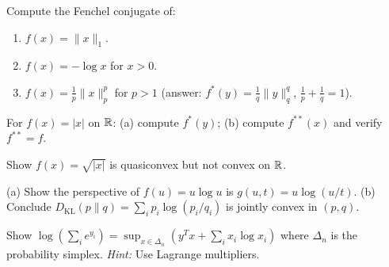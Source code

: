 \documentclass[11pt,a4paper]{article}
\begin{document}
\begin{exercise}
\label{exer:conjugates}
Compute the Fenchel conjugate of:
\begin{enumerate}[label=(\alph*)]
  \item $f(x) = \|x\|_1$.
  \item $f(x) = -\log x$ for $x > 0$.
  \item $f(x) = \frac{1}{p}\|x\|_p^p$ for $p > 1$
        (answer: $f^*(y) = \frac{1}{q}\|y\|_q^q$, $\frac{1}{p}+\frac{1}{q}=1$).
\end{enumerate}
\end{exercise}

\begin{exercise}
\label{exer:biconjugate}
For $f(x) = |x|$ on $\mathbb{R}$: (a) compute $f^*(y)$; (b) compute $f^{**}(x)$ and
verify $f^{**} = f$.
\end{exercise}

\begin{exercise}
\label{exer:quasiconvex}
Show $f(x) = \sqrt{|x|}$ is quasiconvex but not convex on $\mathbb{R}$.
\end{exercise}

\begin{exercise}
\label{exer:perspective-kl}
(a) Show the perspective of $f(u) = u\log u$ is $g(u,t) = u\log(u/t)$.
(b) Conclude $D_{\mathrm{KL}}(p\|q) = \sum_i p_i \log(p_i/q_i)$ is jointly
convex in $(p,q)$.
\end{exercise}

\begin{exercise}
\label{exer:lse-conjugate}
Show $\log(\sum_i e^{y_i}) = \sup_{x \in \Delta_n}(y^T x +
\sum_i x_i \log x_i)$ where $\Delta_n$ is the probability simplex.
\textit{Hint:} Use Lagrange multipliers.
\end{exercise}


\end{document}
